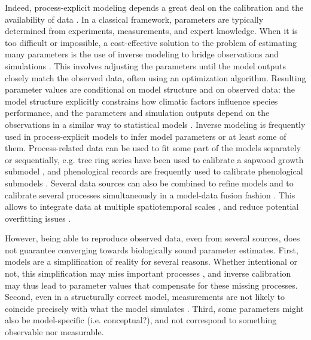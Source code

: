\documentclass[letterpaper,8pt]{extarticle}  %
\begin{document}
\begin{doublespacing}
\begin{linenumbers}
Indeed, process-explicit modeling depends a great deal on the calibration and the availability of data \citep{Cabral2017}. In a classical framework, parameters are typically determined from experiments, measurements, and expert knowledge. When it is too difficult or impossible, a cost-effective solution to the problem of estimating many parameters is the use of inverse modeling to bridge observations and simulations \citep{Evans2016}. This involves adjusting the parameters until the model outputs closely match the observed data, often using an optimization algorithm. Resulting parameter values are conditional on model structure and on observed data: the model structure explicitly constrains how climatic factors influence species performance, and the parameters and simulation outputs depend on the observations in a similar way to statistical models \citep{Zhang2024}. Inverse modeling is frequently used in process-explicit models to infer model parameters or at least some of them. Process-related data can be used to fit some part of the models separately or sequentially, e.g. tree ring series have been used to calibrate a sapwood growth submodel \citep{DeCaceres2023}, and phenological records are frequently used to calibrate phenological submodels \citep{Chuine2013}. Several data sources can also be combined to refine models \citep{BenitoGarzon2019} and to calibrate several processes simultaneously in a model-data fusion fashion \citep[e.g.][]{Trotsiuk2020}. This allows to integrate data at multiple spatiotemporal scales \citep{Hartig2012, Niu2014}, and reduce potential overfitting issues \citep{Bacour2023}.

However, being able to reproduce observed data, even from several sources, does not guarantee converging towards biologically sound parameter estimates. First, models are a simplification of reality for several reasons. Whether intentional or not, this simplification may miss important processes \citep{Forrester2021}, and inverse calibration may thus lead to parameter values that compensate for these missing processes. Second, even in a structurally correct model, measurements are not likely to coincide precisely with what the model simulates \citep{Zhang2024}. Third, some parameters might also be model-specific (i.e. conceptual?), and not correspond to something observable nor measurable.


\end{linenumbers}
\end{doublespacing}
\end{document}
